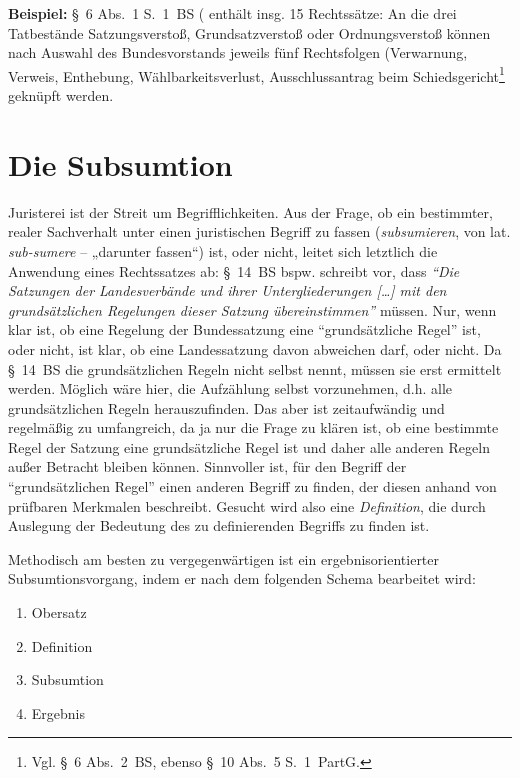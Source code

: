 \textbf{Beispiel:} \S~6 Abs.~1 S.~1~BS ( enthält insg. 15 Rechtssätze: An die drei Tatbestände Satzungsverstoß, Grundsatzverstoß oder Ordnungsverstoß können nach Auswahl des Bundesvorstands jeweils fünf Rechtsfolgen (Verwarnung, Verweis, Enthebung, Wählbarkeitsverlust, Ausschlussantrag beim Schiedsgericht\footnote{Vgl. \S~6 Abs.~2~BS, ebenso \S~10 Abs.~5 S.~1~PartG.} geknüpft werden.


\section{Die Subsumtion}
Juristerei ist der Streit um Begrifflichkeiten. Aus der Frage, ob ein bestimmter, realer Sachverhalt unter einen juristischen Begriff zu fassen (\emph{subsumieren}, von lat. \emph{sub-sumere} – „darunter fassen“) ist, oder nicht, leitet sich letztlich die Anwendung eines Rechtssatzes ab: \S~14~BS bspw. schreibt vor, dass \emph{\enquote{Die Satzungen der Landesverbände und ihrer Untergliederungen […] mit den grundsätzlichen Regelungen dieser Satzung übereinstimmen}} müssen. Nur, wenn klar ist, ob eine Regelung der Bundessatzung eine \enquote{grundsätzliche Regel} ist, oder nicht, ist klar, ob eine Landessatzung davon abweichen darf, oder nicht. Da \S~14~BS die grundsätzlichen Regeln nicht selbst nennt, müssen sie erst ermittelt werden. Möglich wäre hier, die Aufzählung selbst vorzunehmen, d.h. alle grundsätzlichen Regeln herauszufinden. Das aber ist zeitaufwändig und regelmäßig zu umfangreich, da ja nur die Frage zu klären ist, ob eine bestimmte Regel der Satzung eine grundsätzliche Regel ist und daher alle anderen Regeln außer Betracht bleiben können. Sinnvoller ist, für den Begriff der \enquote{grundsätzlichen Regel} einen anderen Begriff zu finden, der diesen anhand von prüfbaren Merkmalen beschreibt. Gesucht wird also eine \emph{Definition}, die durch Auslegung der Bedeutung des zu definierenden Begriffs zu finden ist.

Methodisch am besten zu vergegenwärtigen ist ein ergebnisorientierter Subsumtionsvorgang, indem er nach dem folgenden Schema bearbeitet wird:
\begin{enumerate}
\item Obersatz
\item Definition
\item Subsumtion
\item Ergebnis
\end{enumerate}

